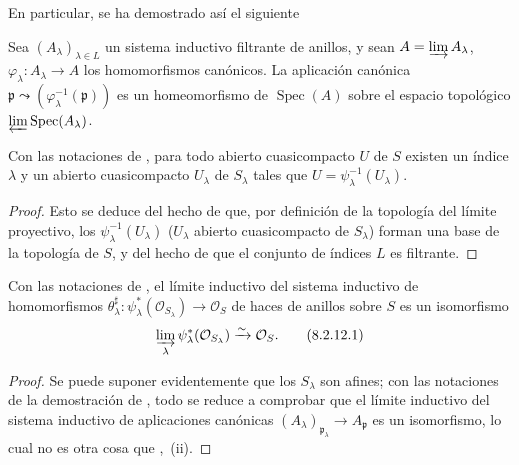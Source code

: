 En particular, se ha demostrado así el siguiente

\begin{corollary}[8.2.10]
\label{IV.8.2.10-fr}
Sea $(A_\lambda)_{\lambda\in L}$ un sistema inductivo filtrante de anillos, y sean $A=\varinjlim A_\lambda$, $\varphi_\lambda:A_\lambda\to A$ los homomorfismos canónicos.
La aplicación canónica $\mathfrak p\leadsto(\varphi_\lambda^{-1}(\mathfrak p))$ es un homeomorfismo de $\operatorname{Spec}(A)$ sobre el espacio topológico $\varprojlim\operatorname{Spec}(A_\lambda)$.
\end{corollary}

\begin{corollary}[8.2.11]
Con las notaciones de , para todo abierto cuasicompacto $U$ de $S$ existen un índice $\lambda$ y un abierto cuasicompacto $U_\lambda$ de $S_\lambda$ tales que $U=\psi_\lambda^{-1}(U_\lambda)$.
\end{corollary}

\begin{proof}
Esto se deduce del hecho de que, por definición de la topología del límite proyectivo, los $\psi_\lambda^{-1}(U_\lambda)$ ($U_\lambda$ abierto cuasicompacto de $S_\lambda$) forman una base de la topología de $S$, y del hecho de que el conjunto de índices $L$ es filtrante.
\end{proof}

\begin{corollary}[8.2.12]
\label{IV.8.2.12-fr}
Con las notaciones de , el límite inductivo del sistema inductivo de homomorfismos $\theta_\lambda^\sharp:\psi_\lambda^*(\mathcal O_{S_\lambda})\to
\mathcal O_S$ de haces de anillos sobre $S$ es un isomorfismo
\begin{equation}
\varinjlim_\lambda\psi_\lambda^*(\mathcal O_{S_\lambda})
\xrightarrow{\sim}\mathcal O_S.
\tag{8.2.12.1}\label{IV.8.2.12.1-fr}
\end{equation}
\end{corollary}

\begin{proof}
Se puede suponer evidentemente que los $S_\lambda$ son afines; con las notaciones de la demostración de , todo se reduce a comprobar que el límite inductivo del sistema inductivo de aplicaciones canónicas $(A_\lambda)_{\mathfrak p_\lambda}\to A_{\mathfrak p}$ es un isomorfismo, lo cual no es otra cosa que ,~(ii).

\end{proof}


